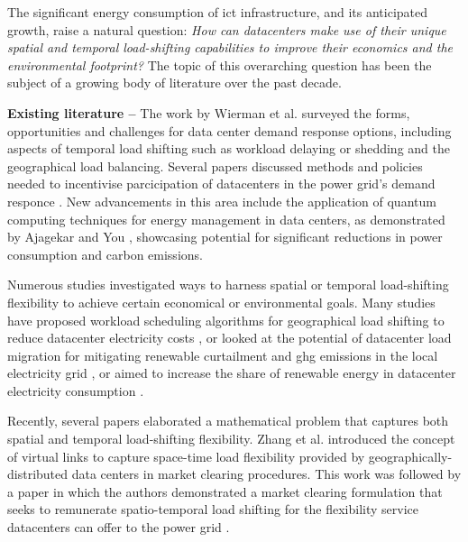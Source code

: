 The significant energy consumption of \gls{ict} infrastructure, and its anticipated growth, raise a natural question: \textit{How can datacenters make use of their unique spatial and temporal load-shifting capabilities to improve their economics and the environmental footprint?} The topic of this overarching question has been the subject of a growing body of literature over the past decade.

\textbf{Existing literature --} The work by Wierman et al.  \cite{wiermanOpportunitiesChallengesData2014} surveyed the forms, opportunities and challenges for data center demand response options, including aspects of temporal load shifting such as workload delaying or shedding and the geographical load balancing. Several papers discussed methods and policies needed to incentivise parcicipation of datacenters in the power grid's demand responce \cite{liuPricingDataCenter2014, zhouTruthfulEfficientIncentive2020}.  New advancements in this area include the application of quantum computing techniques for energy management in data centers, as demonstrated by Ajagekar and You \cite{ajagekarVariationalQuantumCircuit2024}, showcasing potential for significant reductions in power consumption and carbon emissions.

Numerous studies investigated ways to harness spatial or temporal load-shifting flexibility to achieve certain economical or environmental goals. Many studies have proposed workload scheduling algorithms for geographical load shifting to reduce datacenter electricity costs \cite{velascoElasticOperationsFederated2014, douCarbonAwareElectricityCost2017, heMinimizingOperationCost2021, raoDistributedCoordinationInternet2012, renCarbonAwareEnergyCapacity2012, dengEcoAwareOnlinePower2016}, or looked at the potential of datacenter load migration for mitigating renewable curtailment and \gls{ghg} emissions in the local electricity grid \cite{zhengMitigatingCurtailmentCarbon2020, mahmudDistributedFrameworkCarbon2016}, or aimed to increase the share of renewable energy in datacenter electricity consumption \cite{wangGreenawareVirtualMachine2015, kimDataCentersDispatchable2017, liuGeographicalLoadBalancing2011, kellyBalancingPowerSystems2016}.

Recently, several papers elaborated a mathematical problem that captures both spatial and temporal load-shifting flexibility. Zhang et al. \cite{zhangFlexibilityNetworksData2020} introduced the concept of virtual links to capture space-time load flexibility provided by geographically-distributed data centers in market clearing procedures. This work was followed by a paper in which the authors demonstrated a market clearing formulation that seeks to remunerate spatio-temporal load shifting for the flexibility service datacenters can offer to the power grid \cite{zhangRemuneratingSpaceTime2022}.

